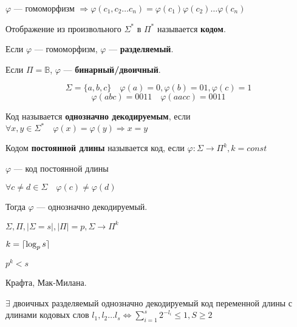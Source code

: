 $\varphi$ --- гомоморфизм $\Rightarrow \varphi(c_1,c_2\ldots c_n)=\varphi(c_1)\varphi(c_2)\ldots\varphi(c_n)$

\begin{definition}
    Отображение из произвольного $\Sigma^*$ в $\Pi^*$ называется \textbf{кодом}.

    Если $\varphi$ --- гомоморфизм, $\varphi$ --- \textbf{разделяемый}.

    Если $\Pi=\mathbb{B}$, $\varphi$ --- \textbf{бинарный/двоичный}.
\end{definition}

\begin{example}
    $$\Sigma=\{a,b,c\} \quad \varphi(a)=0, \varphi(b)=01, \varphi(c)=1$$
    $$\varphi(abc)=0011 \quad \varphi(aacc)=0011$$
\end{example}

\begin{definition}
    Код называется \textbf{однозначно декодируемым}, если $\forall x,y\in\Sigma^* \quad \varphi(x)=\varphi(y) \Rightarrow x=y$
\end{definition}

\begin{definition}
    Кодом \textbf{постоянной длины} называется код, если $\varphi: \Sigma\to\Pi^k, k=const$
\end{definition}

\begin{lemma}
    $\varphi$ --- код постоянной длины

    $\forall c\not=d\in\Sigma \quad \varphi(c)\not=\varphi(d)$

    Тогда $\varphi$ --- однозначно декодируемый.
\end{lemma}

\begin{theorem}
    $\Sigma, \Pi, |\Sigma=s|, |\Pi|=p, \Sigma\to \Pi^k$
    
    $k=\lceil\log_p s\rceil$

    $p^k<s$
\end{theorem}

\begin{theorem}
    Крафта, Мак-Милана.

    $\exists$ двоичных разделяемый однозначно декодируемый код переменной длины с длинами кодовых слов $l_1,l_2\ldots l_s\Leftrightarrow\sum_{i=1}^s 2^{-l_i}\leq 1, S\geq 2$
\end{theorem}

